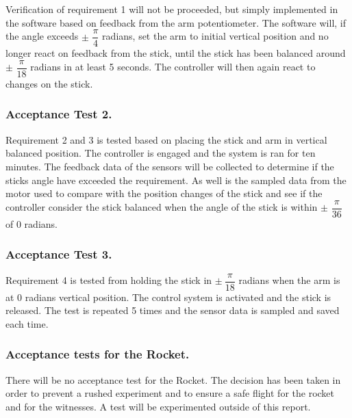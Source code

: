 \forceindent Verification of requirement 1 will not be proceeded, but simply implemented in the software based on feedback from the arm potentiometer. The software will, if the angle exceeds $\pm$ $\dfrac{\pi}{4}$ radians, set the arm to initial vertical position and no longer react on feedback from the stick, until the stick has been balanced around $\pm$ $\dfrac{\pi}{18}$ radians in at least 5 seconds. The controller will then again react to changes on the stick.    

\subsubsection*{Acceptance Test 2.}

\forceindent Requirement 2 and 3 is tested based on placing the stick and arm in vertical balanced position. The controller is engaged and the system is ran for ten minutes. The feedback data of the sensors will be collected to determine if the sticks angle have exceeded the requirement. As well is the sampled data from the motor used to compare with the position changes of the stick and see if the controller consider the stick balanced when the angle of the stick is within $\pm$ $\dfrac{\pi}{36}$ of 0 radians. 

\subsubsection*{Acceptance Test 3.}
\forceindent Requirement 4 is tested from holding the stick in $\pm\ \dfrac{\pi}{18}$ radians when the arm is at 0 radians vertical position. The control system is activated and the stick is released. The test is repeated 5 times and the sensor data is sampled and saved each time.

\subsubsection*{Acceptance tests for the Rocket.}
\forceindent There will be no acceptance test for the Rocket. The decision has been taken in order to prevent a rushed experiment and to ensure a safe flight for the rocket and for the witnesses. A test will be experimented outside of this report.